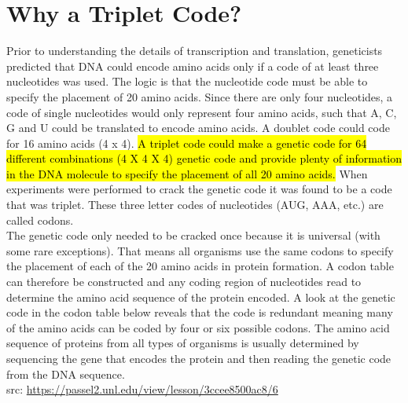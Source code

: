 \section*{Why a Triplet Code?}
Prior to understanding the details of transcription and translation, geneticists predicted that DNA could encode amino acids only if a code of at least three nucleotides was used. The logic is that the nucleotide code must be able to specify the placement of 20 amino acids. Since there are only four nucleotides, a code of single nucleotides would only represent four amino acids, such that A, C, G and U could be translated to encode amino acids. A doublet code could code for 16 amino acids (4 x 4). \hl{A triplet code could make a genetic code for 64 different combinations (4 X 4 X 4) genetic code and provide plenty of information in the DNA molecule to specify the placement of all 20 amino acids.} When experiments were performed to crack the genetic code it was found to be a code that was triplet. These three letter codes of nucleotides (AUG, AAA, etc.) are called codons.\\
The genetic code only needed to be cracked once because it is universal (with some rare exceptions). That means all organisms use the same codons to specify the placement of each of the 20 amino acids in protein formation. A codon table can therefore be constructed and any coding region of nucleotides read to determine the amino acid sequence of the protein encoded. A look at the genetic code in the codon table below reveals that the code is redundant meaning many of the amino acids can be coded by four or six possible codons. The amino acid sequence of proteins from all types of organisms is usually determined by sequencing the gene that encodes the protein and then reading the genetic code from the DNA sequence.
\\src: \url{https://passel2.unl.edu/view/lesson/3ccee8500ac8/6}